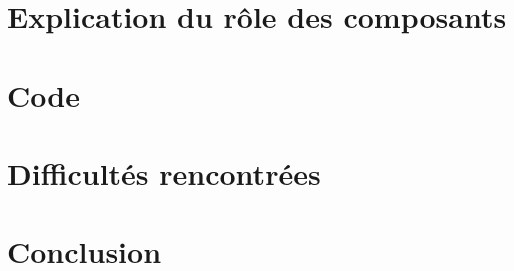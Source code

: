 \documentclass[12pt]{article}
\begin{document}
\section{Explication du rôle des composants}


\section{Code}


\section{Difficultés rencontrées}


\section{Conclusion}

\end{document}
